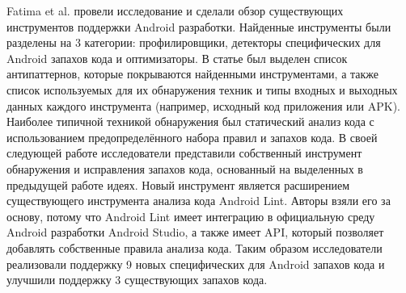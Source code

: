 Fatima et al. \cite{fatima2020tool} провели исследование и сделали обзор существующих инструментов поддержки Android разработки. Найденные инструменты были разделены на 3 категории: профилировщики, детекторы специфических для Android запахов кода и оптимизаторы. В статье был выделен список антипаттернов, которые покрываются найденными инструментами, а также список используемых для их обнаружения техник и типы входных и выходных данных каждого инструмента (например, исходный код приложения или APK). Наиболее типичной техникой обнаружения был статический анализ кода с использованием предопределённого набора правил и запахов кода. В своей следующей работе \cite{fatima2020detection} исследователи представили собственный инструмент обнаружения и исправления запахов кода, основанный на выделенных в предыдущей работе идеях. Новый инструмент является расширением существующего инструмента анализа кода Android Lint. Авторы взяли его за основу, потому что Android Lint имеет интеграцию в официальную среду Android разработки Android Studio, а также имеет API, который позволяет добавлять собственные правила анализа кода. Таким образом исследователи реализовали поддержку 9 новых специфических для Android запахов кода и улучшили поддержку 3 существующих запахов кода.

